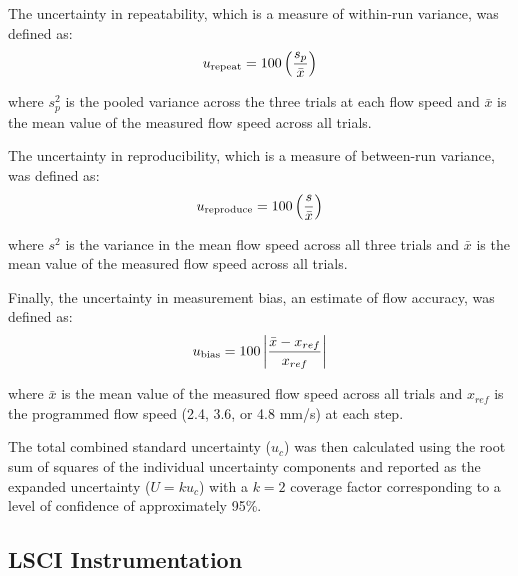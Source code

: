 \documentclass[12pt]{spieman}
\begin{document}
\begin{spacing}{2}
The uncertainty in repeatability, which is a measure of within-run variance, was defined as:
%
\begin{equation}
    \label{eq:u_repeat}
    u_\textnormal{repeat} = 100\left(\frac{s_p}{\bar{x}}\right)
\end{equation}

\noindent where $s_p^2$ is the pooled variance across the three trials at each flow speed and $\bar{x}$ is the mean value of the measured flow speed across all trials.

The uncertainty in reproducibility, which is a measure of between-run variance, was defined as:
%
\begin{equation}
    \label{eq:u_reproduce}
    u_\textnormal{reproduce} = 100\left(\frac{s}{\bar{x}}\right)
\end{equation}

\noindent where $s^2$ is the variance in the mean flow speed across all three trials and $\bar{x}$ is the mean value of the measured flow speed across all trials.

Finally, the uncertainty in measurement bias, an estimate of flow accuracy, was defined as:
%
\begin{equation}
    \label{eq:u_bias}
    u_\textnormal{bias} = 100 \left| \frac{\bar{x} - x_{ref}}{x_{ref}} \right|
\end{equation}

\noindent where $\bar{x}$ is the mean value of the measured flow speed across all trials and $x_{ref}$ is the programmed flow speed (2.4, 3.6, or 4.8 mm/s) at each step.

The total combined standard uncertainty ($u_c$) was then calculated using the root sum of squares of the individual uncertainty components and reported as the expanded uncertainty ($U=ku_c$) with a $k=2$ coverage factor corresponding to a level of confidence of approximately 95\%.


\subsection{LSCI Instrumentation}


\end{spacing}
\end{document}
